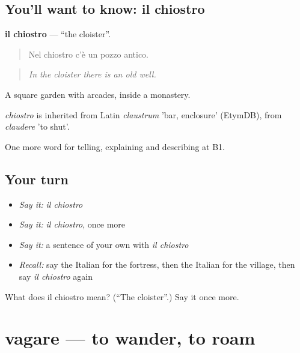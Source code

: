 \subsection*{You'll want to know: il chiostro}
\textbf{il chiostro} — \textquotedblleft{}the cloister\textquotedblright{}.

\begin{quote}
Nel chiostro c'è un pozzo antico.
\end{quote}

\begin{quote}
\emph{In the cloister there is an old well.}
\end{quote}

A square garden with arcades, inside a monastery.

\begin{cousinweb}
\emph{chiostro} is inherited from Latin \emph{claustrum} 'bar, enclosure' (EtymDB), from \emph{claudere} 'to shut'.
\end{cousinweb}

\begin{grammarlens}[title={What you've built}]
One more word for telling, explaining and describing at B1.
\end{grammarlens}

\subsection*{Your turn}
\begin{itemize}
\raggedright
  \item \emph{Say it:} \emph{il chiostro}
  \item \emph{Say it:} \emph{il chiostro}, once more
  \item \emph{Say it:} a sentence of your own with \emph{il chiostro}
  \item \emph{Recall:} say the Italian for the fortress, then the Italian for the village, then say \emph{il chiostro} again
\end{itemize}

\begin{tcolorbox}[breakable,colback=teal!4,colframe=teal!35!black,title={Before you move on}]
What does il chiostro mean? (\textquotedblleft{}The cloister\textquotedblright{}.) Say it once more.
\end{tcolorbox}
\section[vagare]{vagare — to wander, to roam}


